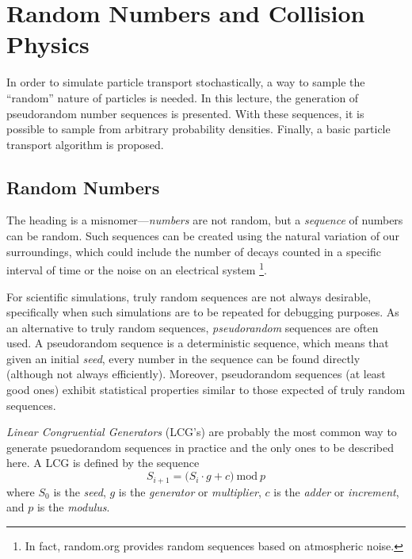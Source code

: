 \chapter{Random Numbers and Collision Physics}

In order to simulate particle transport stochastically, a way 
to sample the ``random'' nature of particles is needed.  In this 
lecture, the generation of pseudorandom number sequences is 
presented.  With these sequences, it is possible to sample 
from arbitrary probability densities.  
Finally, a basic particle transport algorithm is proposed.


\section*{Random Numbers}

The heading is a misnomer---\emph{numbers} are not random, but a 
\emph{sequence} of numbers can be random. Such sequences can be 
created using the natural variation of our 
surroundings, which could include the number of decays counted in 
a specific interval of time or the noise on an electrical 
system \footnote{In fact, random.org provides random sequences
based on atmospheric noise.}.  

For scientific simulations, truly random sequences are not always desirable, 
specifically  when such simulations are to be repeated for debugging purposes.
As an alternative to truly random sequences,  
\emph{pseudorandom} sequences are often used.  A pseudorandom 
sequence is a deterministic sequence, which means that given an 
initial \emph{seed}, every number in the sequence can be 
found directly (although not always efficiently).  Moreover,
pseudorandom sequences (at least good ones) exhibit statistical
properties similar to those expected of truly random sequences.



\emph{Linear Congruential Generators} (LCG's) are probably 
the most common way to generate psuedorandom 
sequences in practice and the only ones 
to be described here.  A LCG is defined by the sequence
\begin{equation}
  S_{i+1} = \Big ( S_{i} \cdot g+c \Big ) \: \textrm{mod} \: p
\label{eq:lcg}
\end{equation}
where $S_0$ is the  \emph{seed},
$g$ is the   \emph{generator} or   \emph{multiplier},
$c$ is the  \emph{adder} or \emph{increment},
and $p$ is the  \emph{modulus}.  

